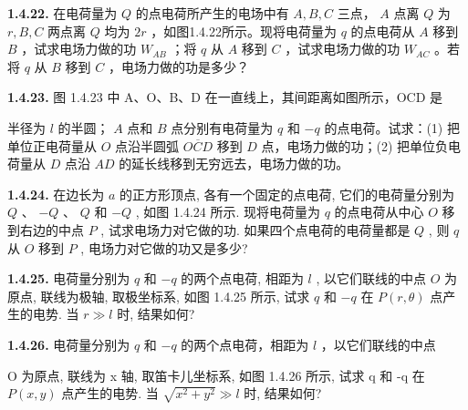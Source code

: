 \textbf{1.4.22.} 在电荷量为 $Q$ 的点电荷所产生的电场中有 $A, B, C$ 三点， $A$ 点离 $Q$ 为 $r, B, C$ 两点离 $Q$ 均为 $2r$ ，如图1.4.22所示。现将电荷量为 $q$ 的点电荷从 $A$ 移到 $B$ ，试求电场力做的功 $W_{AB}$ ；将 $q$ 从 $A$ 移到 $C$ ，试求电场力做的功 $W_{AC}$ 。若将 $q$ 从 $B$ 移到 $C$ ，电场力做的功是多少？


\begin{center}
\end{center}

\vfill

\newpage
\textbf{1.4.23.} 图 1.4.23 中 A、O、B、D 在一直线上，其间距离如图所示，OCD 是


半径为 $l$ 的半圆； $A$ 点和 $B$ 点分别有电荷量为 $q$ 和 $-q$ 的点电荷。试求：(1) 把单位正电荷量从 $O$ 点沿半圆弧 $\overline{OCD}$ 移到 $D$ 点，电场力做的功；(2) 把单位负电荷量从 $D$ 点沿 $AD$ 的延长线移到无穷远去，电场力做的功。

\begin{center}
\end{center}

\vfill

\textbf{1.4.24.} 在边长为 $a$ 的正方形顶点, 各有一个固定的点电荷, 它们的电荷量分别为 $Q$ 、 $-Q$ 、 $Q$ 和 $-Q$ , 如图 1.4.24 所示. 现将电荷量为 $q$ 的点电荷从中心 $O$ 移到右边的中点 $P$ , 试求电场力对它做的功. 如果四个点电荷的电荷量都是 $Q$ , 则 $q$ 从 $O$ 移到 $P$ , 电场力对它做的功又是多少?


\begin{center}
\end{center}

\vfill

\newpage
\textbf{1.4.25.} 电荷量分别为 $q$ 和 $-q$ 的两个点电荷, 相距为 $l$ , 以它们联线的中点 $O$ 为原点, 联线为极轴, 取极坐标系, 如图 1.4.25 所示, 试求 $q$ 和 $-q$ 在 $P(r, \theta)$ 点产生的电势. 当 $r \gg l$ 时, 结果如何?



\begin{center}
\end{center}


\vfill

\textbf{1.4.26.} 电荷量分别为 $q$ 和 $-q$ 的两个点电荷，相距为 $l$ ，以它们联线的中点


O 为原点, 联线为 x 轴, 取笛卡儿坐标系, 如图 1.4.26 所示, 试求 q 和 -q 在 $P(x, y)$ 点产生的电势. 当 $\sqrt{x^{2} + y^{2}} \gg l$ 时, 结果如何?

